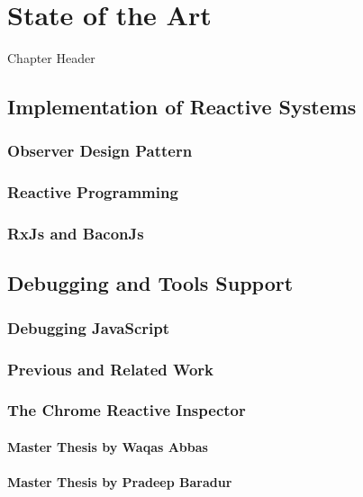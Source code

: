\chapter{State of the Art} \label{chap:State of the Art}
Chapter Header

\section{Implementation of Reactive Systems}

\subsection{Observer Design Pattern}

\subsection{Reactive Programming}

\subsection{RxJs and BaconJs}

\section{Debugging and Tools Support}

\subsection{Debugging JavaScript}


\subsection{Previous and Related Work}
\subsection{The Chrome Reactive Inspector}
	\subsubsection{Master Thesis by Waqas Abbas}
	\subsubsection{Master Thesis by Pradeep Baradur}
